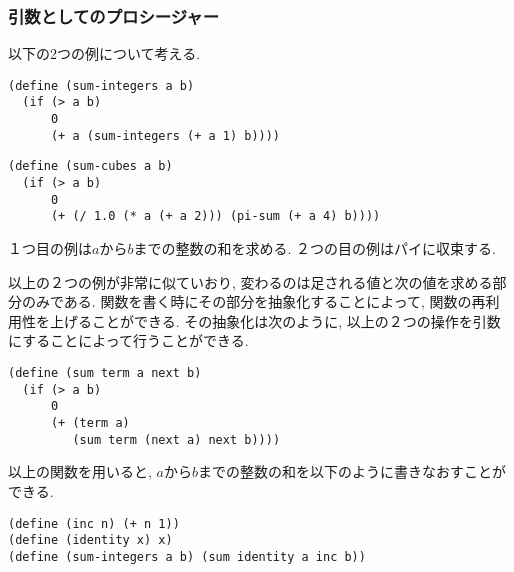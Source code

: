 \subsubsection{引数としてのプロシージャー}
以下の2つの例について考える.
%
\begin{lstlisting}[basicstyle=\footnotesize,title=$a$から$b$までの整数の和]
(define (sum-integers a b)
  (if (> a b)
      0
      (+ a (sum-integers (+ a 1) b))))
\end{lstlisting}
%
\begin{lstlisting}[basicstyle=\footnotesize,title=$\pi$の数列]
(define (sum-cubes a b)
  (if (> a b)
      0
      (+ (/ 1.0 (* a (+ a 2))) (pi-sum (+ a 4) b))))
\end{lstlisting}

１つ目の例は$a$から$b$までの整数の和を求める. ２つの目の例はパイに収束する.

以上の２つの例が非常に似ていおり, 変わるのは足される値と次の値を求める部分のみである.
関数を書く時にその部分を抽象化することによって, 関数の再利用性を上げることができる.
その抽象化は次のように, 以上の２つの操作を引数にすることによって行うことができる.
%
\begin{lstlisting}[basicstyle=\footnotesize,title=一般的な和の関数]
(define (sum term a next b)
  (if (> a b)
      0
      (+ (term a)
         (sum term (next a) next b))))
\end{lstlisting}

以上の関数を用いると, $a$から$b$までの整数の和を以下のように書きなおすことができる.

\begin{lstlisting}[basicstyle=\footnotesize,title=一般的な和を用いた$a$から$b$までの整数]
(define (inc n) (+ n 1))
(define (identity x) x)
(define (sum-integers a b) (sum identity a inc b))
\end{lstlisting}
